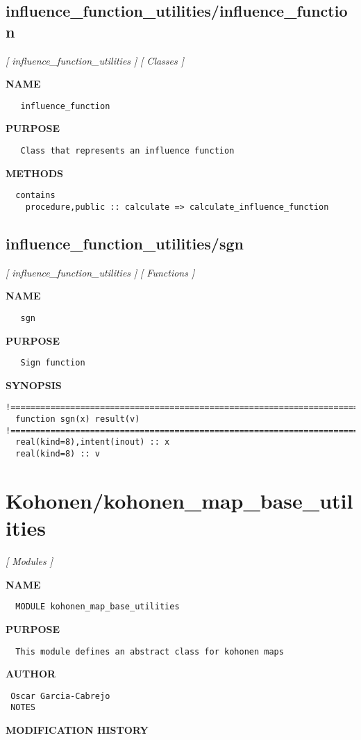 \documentclass{article}
\begin{document}
\subsection{influence\_function\_utilities/influence\_function}
\textsl{[ influence\_function\_utilities ]}
\textsl{[ Classes ]}

\label{ch:robo16}
\label{ch:influence_function_utilities_influence_function}
\textbf{NAME}
\begin{verbatim}
   influence_function
\end{verbatim}
\textbf{PURPOSE}
\begin{verbatim}
   Class that represents an influence function
\end{verbatim}
\textbf{METHODS}
\begin{verbatim}
  contains
    procedure,public :: calculate => calculate_influence_function
\end{verbatim}
\newpage
\subsection{influence\_function\_utilities/sgn}
\textsl{[ influence\_function\_utilities ]}
\textsl{[ Functions ]}

\label{ch:robo17}
\label{ch:influence_function_utilities_sgn}
\textbf{NAME}
\begin{verbatim}
   sgn
\end{verbatim}
\textbf{PURPOSE}
\begin{verbatim}
   Sign function
\end{verbatim}
\textbf{SYNOPSIS}
\begin{verbatim}
!========================================================================================
  function sgn(x) result(v)
!======================================================================================== 
  real(kind=8),intent(inout) :: x
  real(kind=8) :: v
\end{verbatim}
\newpage
\section{Kohonen/kohonen\_map\_base\_utilities}
\textsl{[ Modules ]}

\label{ch:robo4}
\label{ch:Kohonen_kohonen_map_base_utilities}
\textbf{NAME}
\begin{verbatim}
  MODULE kohonen_map_base_utilities
\end{verbatim}
\textbf{PURPOSE}
\begin{verbatim}
  This module defines an abstract class for kohonen maps 
\end{verbatim}
\textbf{AUTHOR}
\begin{verbatim}
 Oscar Garcia-Cabrejo
 NOTES 
\end{verbatim}
\textbf{MODIFICATION HISTORY}
\newpage
\end{document}
